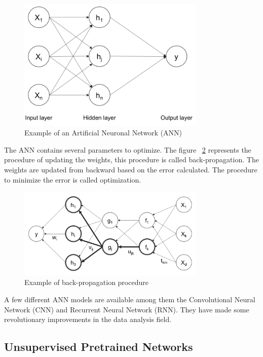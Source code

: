 \begin{figure}[H]
\centering
\includegraphics[width=0.8\textwidth]{./figures/ann}
\caption{Example of an Artificial Neuronal Network (ANN) \cite{rajalingappaa}}
\label{fig:ann}
\end{figure}
 
The ANN contains several parameters to optimize. The figure 
~\ref{fig:backpropragation} represents the procedure of updating the weights, this procedure is called back-propagation. The weights are updated from backward based on the error calculated. The procedure to minimize the error is called optimization.

\begin{figure}[H]
\centering
\includegraphics[width=0.8\textwidth]{./figures/backpropagation}
\caption{Example of back-propagation procedure \cite{rajalingappaa}}
\label{fig:backpropragation}
\end{figure}

   
A few different ANN models are available among them the Convolutional Neural Network (CNN) and Recurrent Neural Network (RNN). They have made some revolutionary improvements in the data analysis field. 

\subsection[Unsupervised Pretrained Networks]{Unsupervised Pretrained Networks}

